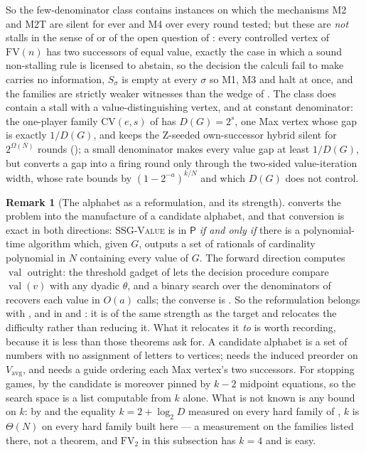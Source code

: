 \documentclass[11pt]{article}
\theoremstyle{plain}
\theoremstyle{definition}
\newtheorem{remark}[theorem]{Remark}
\DeclareMathOperator{\val}{val}
\newcommand{\Vavg}{V_{\mathrm{avg}}}
\begin{document}
So the few-denominator class contains instances on which the mechanisms
M2 and M2T are silent for ever and M4 over every round tested; but these are \emph{not} stalls in
the sense of  or of the open question of
: every controlled vertex of $\mathrm{FV}(n)$
has two successors of equal value, exactly the case in which a sound
non-stalling rule is licensed to abstain, so the decision the calculi fail
to make carries no information, $S_\sigma$ is empty at every $\sigma$ so
M1, M3 and  halt at once, and the families are strictly
weaker witnesses than the wedge of . The class does
contain a stall with a value-distinguishing vertex, and at constant
denominator: the one-player family $\mathrm{CV}(e,s)$ of 
has $D(G)=2^{s}$, one Max vertex whose gap is exactly $1/D(G)$, and keeps
the Z-seeded own-successor hybrid silent for $2^{\Omega(N)}$ rounds
(); a small denominator makes every value
gap at least $1/D(G)$, but  converts a gap into
a firing round only through the two-sided value-iteration width, whose
rate  bounds by $(1-2^{-a})^{k/N}$ and which
$D(G)$ does not control.


\begin{remark}[The alphabet as a reformulation, and its strength]\label{rem:alphabet-equivalence}
 converts the problem into the manufacture of
a candidate alphabet, and that conversion is exact in both directions:
\textsc{SSG-Value} is in $\mathsf P$ \emph{if and only if} there is a
polynomial-time algorithm which, given $G$, outputs a set of rationals of
cardinality polynomial in $N$ containing every value of $G$. The forward
direction computes $\val$ outright: the threshold gadget of
 lets the decision procedure compare
$\val(v)$ with any dyadic $\theta$, and a binary search over the
denominators of  recovers each value in $O(a)$
calls; the converse is . So the
reformulation belongs with ,
 and  in
 and : it is of the same strength as the target and
relocates the difficulty rather than reducing it. What it relocates it
\emph{to} is worth recording, because it is less than those theorems ask
for. A candidate alphabet is a set of numbers with no assignment of
letters to vertices;  needs the induced
preorder on $\Vavg$, and  needs a guide ordering each Max
vertex's two successors. For stopping games, by  the candidate is
moreover pinned by $k-2$ midpoint equations, so the search space is a list
computable from $k$ alone. What is not known is any bound on $k$: by
 and the equality
$k=2+\log_2 D$ measured on every hard family of
, $k$ is $\Theta(N)$ on every hard family
built here --- a measurement on the families listed there, not a theorem, and
$\mathrm{FV}_2$ in this subsection has $k=4$ and is easy.
\end{remark}
\end{document}
